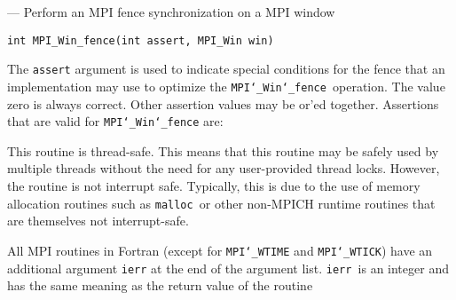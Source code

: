 \startmanpage
{}
--- Perform an MPI fence synchronization on a MPI window 
\startvb\begin{verbatim}
int MPI_Win_fence(int assert, MPI_Win win)

\end{verbatim}
\endvb

\par
{}
The {\tt assert} argument is used to indicate special conditions for the
fence that an implementation may use to optimize the {\tt MPI{\tt \char`\_}Win{\tt \char`\_}fence
}operation.  The value zero is always correct.  Other assertion values
may be or'ed together.  Assertions that are valid for {\tt MPI{\tt \char`\_}Win{\tt \char`\_}fence} are:
\par
{}
\par
{}
\par
This routine is thread-safe.  This means that this routine may be
safely used by multiple threads without the need for any user-provided
thread locks.  However, the routine is not interrupt safe.  Typically,
this is due to the use of memory allocation routines such as {\tt malloc
}or other non-MPICH runtime routines that are themselves not interrupt-safe.
\par
{}
All MPI routines in Fortran (except for {\tt MPI{\tt \char`\_}WTIME} and {\tt MPI{\tt \char`\_}WTICK}) have
an additional argument {\tt ierr} at the end of the argument list.  {\tt ierr
}is an integer and has the same meaning as the return value of the routine
